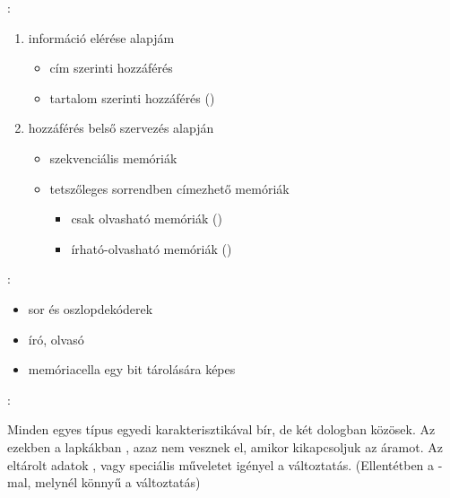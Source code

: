 \documentclass[main.tex]{subfiles}
\begin{document}
  {\large {}:}
  \begin{enumerate}
    \item információ elérése alapjám
    \begin{itemize}
      \item cím szerinti hozzáférés
      
      \item tartalom szerinti hozzáférés ()
    \end{itemize}

    \item hozzáférés belső szervezés alapján
    \begin{itemize}
      \item szekvenciális memóriák
      
      \item tetszőleges sorrendben címezhető memóriák
      \begin{itemize}
        \item csak olvasható memóriák ()
        
        \item írható-olvasható memóriák ()
      \end{itemize}
    \end{itemize}
  \end{enumerate}

  {\large {}:}
  \begin{itemize}
    \item sor és oszlopdekóderek
    \item író, olvasó
    \item memóriacella egy bit tárolására képes
  \end{itemize}

  {\large {}:}

  Minden egyes típus egyedi karakterisztikával bír,
  de két dologban közösek. Az 
  ezekben a lapkákban , azaz nem
  vesznek el, amikor kikapcsoljuk az áramot.
  Az eltárolt adatok ,
  vagy speciális műveletet igényel a változtatás.
  (Ellentétben a -mal, melynél könnyű a változtatás)
\end{document}
